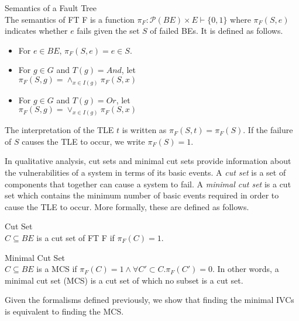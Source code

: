 \begin{definition}Semantics of a Fault Tree\\  
The semantics of FT F is a function $\pi_F : \mathcal{P}(BE) \times E \vdash \{0,1\}$ where $\pi_F(S, e)$ indicates whether $e$ fails given the set $S$ of failed BEs. It is defined as follows. 
\begin{itemize}
\item For $e \in BE$, $\pi_F(S,e) = e \in S$.
\item For $g \in G$ and $T(g) = And$, let\\ $\pi_F(S,g) = \land_{x \in I(g)} \pi_F(S, x)$
\item For $g \in G$ and $T(g) = Or$, let\\ $\pi_F(S,g) = \lor_{x \in I(g)} \pi_F(S, x)$ \\
\end{itemize}
\end{definition}

The interpretation of the TLE $t$ is written as $\pi_F(S,t) = \pi_F(S)$. If the failure of $S$ causes the TLE to occur, we write $\pi_F(S) = 1$. 

 In qualitative analysis, cut sets and minimal cut sets provide information about the vulnerabilities of a system in terms of its basic events. A \textit{cut set} is a set of components that together can cause a system to fail. A \textit{minimal cut set} is a cut set which contains the minimum number of basic events required in order to cause the TLE to occur. More formally, these are defined as follows. \\

\begin{definition}Cut Set\\   
 $C \subseteq BE$ is a cut set of FT F if $\pi_F(C) = 1$. \\
\end{definition}

\begin{definition}Minimal Cut Set\\    
$C \subseteq BE$ is a MCS if $\pi_F(C) = 1 \land \forall C' \subset C. \pi_F(C') = 0$. In other words, a minimal cut set (MCS) is a cut set of which no subset is a cut set. \\
\end{definition}

Given the formalisms defined previously, we show that finding the minimal IVCs is equivalent to finding the MCS. \\

